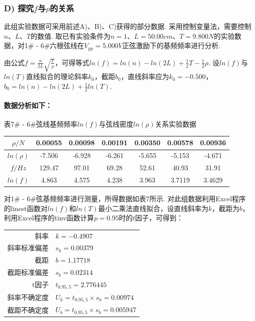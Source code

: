 \documentclass[UTF8]{ctexart}
\begin{document}
\subsubsection*{D) 探究$f$与$\rho$的关系}
此组实验数据可采用前述A)、B)、C)获得的部分数据. 采用控制变量法，需要控制$n$、$L$、$T$的数值. 取已有实验条件为$n=1$、$L=50.00cm$、$T=9.800N$的实验数据，对1\# - 6\#六根弦线在$V_{pp}=5.000V$正弦激励下的基频频率进行分析. \par
由公式${f = \frac{n}{2L}\sqrt{\frac{T}{\rho}}}$，可得等式$ln(f)=ln(n)-ln(2L)+\frac{1}{2}T-\frac{1}{2}\rho$. 设$ln(f)$与$ln(T)$直线拟合的理论斜率$k_0$，截距$b_0$，直线斜率应为$k_0=-0.500$，$b_0=ln(n)-ln(2L)+\frac{1}{2}ln(T)$.
\paragraph{数据分析如下：}
\begin{center}
{\kaishu 表7\# - 6\#弦线基频频率$ln(f)$与弦线密度$ln(\rho)$关系实验数据}
\begin{tabular}{|c|c|c|c|c|c|c|}
\hline
	$\rho/N$&0.00055&0.00098&0.00191&0.00350&0.00578&0.00936\\
\hline
	$ln(\rho)$&-7.506&-6.928&-6.261&-5.655&-5.153&-4.671\\
\hline
	$f/Hz$&129.47&97.01&69.28&52.61&40.93&31.91\\
\hline
	$ln(f)$&4.863&4.575&4.238&3.963&3.7119&3.4629\\
\hline
\end{tabular}
\end{center}
\par 对1\# - 6\#弦基频频率进行测量，所得数据如表7所示. 对此组数据利用Excel程序的linest函数对$ln(f)$和$ln(T)$最小二乘法直线拟合，设直线斜率为$k$，截距为$b$，利用Excel程序的tinv函数计算$p = 0.95$时的$t$因子，可得到：\par
\begin{center}\begin{tabular}{r l}
{斜率}& {$k=-0.4907$}\\
{斜率标准偏差}& {$s_k=0.00379$}\\
{截距}&{$b=1.17718$}\\
{截距标准偏差}&{$s_b=0.02314$}\\
{t因子}& {$t_{0.95,5}=2.776445$}\\
{斜率不确定度}& {$U_k=t_{0.95,5}\times s_k = 0.00974$}\\
{截距不确定度}& {$U_b=t_{0.95,5}\times s_b = 0.005947$}
\end{tabular}\end{center}
\end{document}
